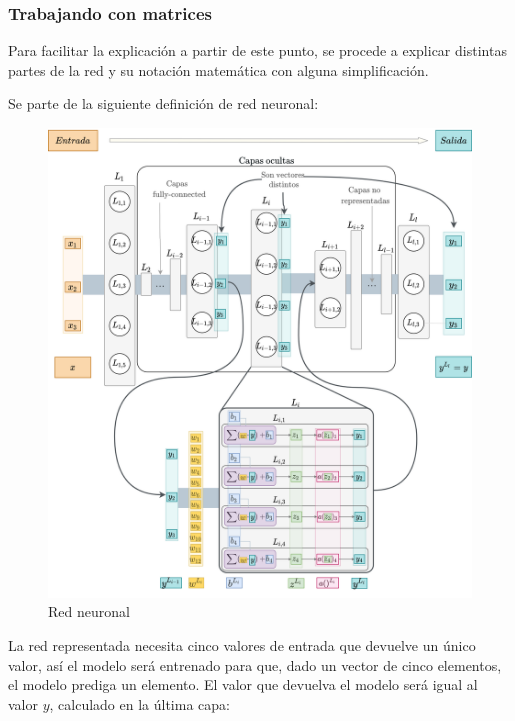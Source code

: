 \subsubsection{Trabajando con matrices}\label{workingwithmatrixes}
Para facilitar la explicación a partir de este punto, se procede a explicar distintas partes de la red y su notación matemática con alguna simplificación.
\newline

Se parte de la siguiente definición de red neuronal:

\begin{figure}[H]
    \centering
    \includegraphics[width=16cm]{images/state-of-art/matrixes/layer_activation_representation.png}
    \caption{Red neuronal}
    \label{fig:basic_network51}
\end{figure}

La red representada necesita cinco valores de entrada que devuelve un único valor, así el modelo será entrenado para que, dado un vector de cinco elementos, el modelo prediga un elemento. El valor que devuelva el modelo será igual al valor $y$, calculado en la última capa:

